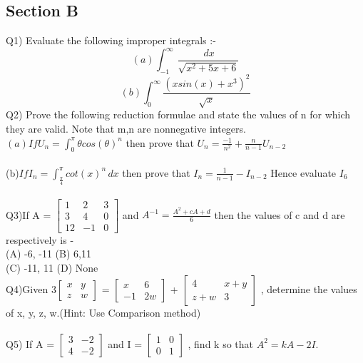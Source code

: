 \documentclass[12pt]{article}
\begin{document}
\begin{large}
\subsection*{Section B}
Q1) Evaluate the following improper integrals :-
\begin{equation*}
(a) \int_{-1}^{\infty} \frac{\,dx}{\sqrt{x^2 +5x + 6}} 
\end{equation*}
\begin{equation*}
(b) \int_{0}^{\infty} \frac{(xsin(x) + x^3)^{2}}{\sqrt{x}}
\end{equation*}
Q2) Prove the following reduction formulae and state the values of n for which they are valid. Note that m,n are nonnegative integers.\\
$(a) If U_{n} = \int_{0}^{\pi} \theta cos(\theta)^n$ then prove that $U_{n} = \frac{-1}{n^2} + \frac{n}{n - 1}U_{n - 2}$\\\\
(b)$If I_{n} = \int_{\frac{\pi}{4}}^{\pi} cot(x)^n \,dx$ then prove that $I_{n} = \frac{1}{n - 1} - I_{n - 2}$ Hence evaluate $I_{6}$\\\\
Q3)If A = 
$
\begin{bmatrix}
1 & 2 & 3\\
3 & 4 & 0\\
12 & -1 & 0
\end{bmatrix}
$
and $A^{-1} = \frac{A^2 + cA + d}{6}$ then the values of c and d are respectively is -\\ 
(A) -6, -11 \hspace{5cm} (B) 6,11\\
(C) -11, 11 \hspace{5cm} (D) None\\
Q4)Given
$
3
\begin{bmatrix}
x & y\\
z & w
\end{bmatrix}
$
=
$  
\begin{bmatrix}
x & 6\\
-1 & 2w
\end{bmatrix}
$
+ 
$
\begin{bmatrix}
4 & x + y\\
z + w & 3
\end{bmatrix}
$
, determine the values of x, y, z, w.(Hint: Use Comparison method)\\\\
Q5) If A = 
$
\begin{bmatrix}
3 & -2\\
4 & -2
\end{bmatrix}
$
and I = 
$
\begin{bmatrix}
1 & 0\\
0 & 1
\end{bmatrix}
$
, find k so that $A^2  = kA - 2I.$
\clearpage

\end{large}
\end{document}
